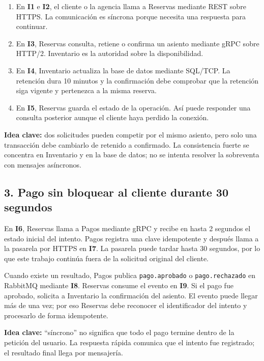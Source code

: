 \documentclass[11pt,a4paper]{article}
\newcommand{\interaccion}[1]{\textbf{I#1}}
\begin{document}
\begin{enumerate}[leftmargin=*,itemsep=2pt]
  \item En \interaccion{1} e \interaccion{2}, el cliente o la agencia llama a Reservas mediante REST sobre HTTPS. La comunicación es síncrona porque necesita una respuesta para continuar.
  \item En \interaccion{3}, Reservas consulta, retiene o confirma un asiento mediante gRPC sobre HTTP/2. Inventario es la autoridad sobre la disponibilidad.
  \item En \interaccion{4}, Inventario actualiza la base de datos mediante SQL/TCP. La retención dura 10 minutos y la confirmación debe comprobar que la retención siga vigente y pertenezca a la misma reserva.
  \item En \interaccion{5}, Reservas guarda el estado de la operación. Así puede responder una consulta posterior aunque el cliente haya perdido la conexión.
\end{enumerate}

\textbf{Idea clave:} dos solicitudes pueden competir por el mismo asiento, pero solo una transacción debe cambiarlo de retenido a confirmado. La consistencia fuerte se concentra en Inventario y en la base de datos; no se intenta resolver la sobreventa con mensajes asíncronos.

\subsection*{3. Pago sin bloquear al cliente durante 30 segundos}

En \interaccion{6}, Reservas llama a Pagos mediante gRPC y recibe en hasta 2 segundos el estado inicial del intento. Pagos registra una clave idempotente y después llama a la pasarela por HTTPS en \interaccion{7}. La pasarela puede tardar hasta 30 segundos, por lo que este trabajo continúa fuera de la solicitud original del cliente.

Cuando existe un resultado, Pagos publica \texttt{pago.aprobado} o \texttt{pago.rechazado} en RabbitMQ mediante \interaccion{8}. Reservas consume el evento en \interaccion{9}. Si el pago fue aprobado, solicita a Inventario la confirmación del asiento. El evento puede llegar más de una vez; por eso Reservas debe reconocer el identificador del intento y procesarlo de forma idempotente.

\textbf{Idea clave:} ``síncrono'' no significa que todo el pago termine dentro de la petición del usuario. La respuesta rápida comunica que el intento fue registrado; el resultado final llega por mensajería.
\end{document}
